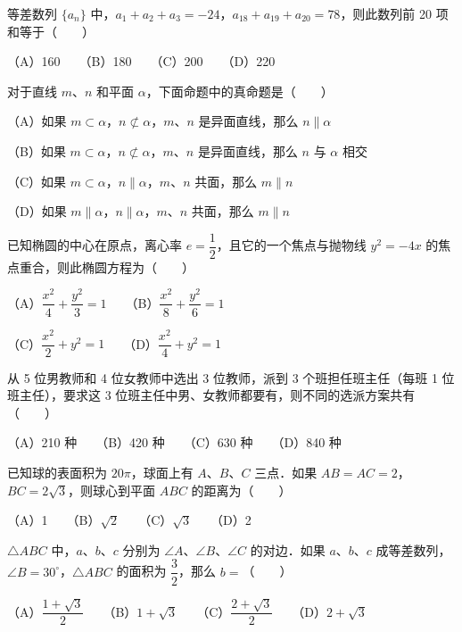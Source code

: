 \begin{question}
等差数列 $\{a_n\}$ 中，$a_1+a_2+a_3=-24$，$a_{18}+a_{19}+a_{20}=78$，则此数列前 20 项和等于\mbox{（　　）}

（A）160　　（B）180　　（C）200　　（D）220

\end{question}
\begin{question}
对于直线 $m$、$n$ 和平面 $\alpha$，下面命题中的真命题是\mbox{（　　）}

（A）如果 $m\subset\alpha$，$n\not\subset\alpha$，$m$、$n$ 是异面直线，那么 $n\parallel\alpha$

（B）如果 $m\subset\alpha$，$n\not\subset\alpha$，$m$、$n$ 是异面直线，那么 $n$ 与 $\alpha$ 相交

（C）如果 $m\subset\alpha$，$n\parallel\alpha$，$m$、$n$ 共面，那么 $m\parallel n$

（D）如果 $m\parallel\alpha$，$n\parallel\alpha$，$m$、$n$ 共面，那么 $m\parallel n$

\end{question}
\begin{question}
已知椭圆的中心在原点，离心率 $e=\dfrac{1}{2}$，且它的一个焦点与抛物线 $y^2=-4x$ 的焦点重合，则此椭圆方程为\mbox{（　　）}

（A）$\dfrac{x^2}{4}+\dfrac{y^2}{3}=1$　　（B）$\dfrac{x^2}{8}+\dfrac{y^2}{6}=1$

（C）$\dfrac{x^2}{2}+y^2=1$　　（D）$\dfrac{x^2}{4}+y^2=1$

\end{question}
\begin{question}
从 5 位男教师和 4 位女教师中选出 3 位教师，派到 3 个班担任班主任（每班 1 位班主任），要求这 3 位班主任中男、女教师都要有，则不同的选派方案共有\mbox{（　　）}

（A）210 种　　（B）420 种　　（C）630 种　　（D）840 种

\end{question}
\begin{question}
已知球的表面积为 $20\pi$，球面上有 $A$、$B$、$C$ 三点．如果 $AB=AC=2$，$BC=2\sqrt{3}$，则球心到平面 $ABC$ 的距离为\mbox{（　　）}

（A）1　　（B）$\sqrt{2}$　　（C）$\sqrt{3}$　　（D）2

\end{question}
\begin{question}
$\triangle ABC$ 中，$a$、$b$、$c$ 分别为 $\angle A$、$\angle B$、$\angle C$ 的对边．如果 $a$、$b$、$c$ 成等差数列，$\angle B=30^\circ$，$\triangle ABC$ 的面积为 $\dfrac{3}{2}$，那么 $b=$\mbox{（　　）}

（A）$\dfrac{1+\sqrt{3}}{2}$　　（B）$1+\sqrt{3}$　　（C）$\dfrac{2+\sqrt{3}}{2}$　　（D）$2+\sqrt{3}$

\end{question}
